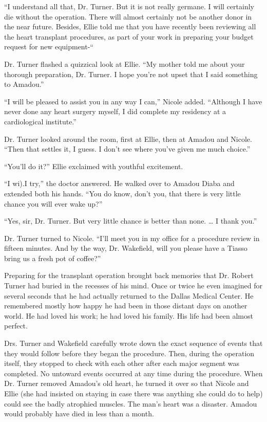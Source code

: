 \documentclass[]{article}
\begin{document}
{“I understand all that, Dr.  Turner.  But it is not really germane.  I will certainly die without the operation.  There will almost certainly not be another donor in the near future.  Besides, Ellie told me that you have recently been reviewing all the heart transplant procedures, as part of your work in preparing your budget request for new equipment-“

Dr.  Turner flashed a quizzical look at Ellie.  “My mother told me about your thorough preparation, Dr.  Turner.  I hope you’re not upset that I said something to Amadou.”

“I will be pleased to assist you in any way I can,” Nicole added.  “Although I have never done any heart surgery myself, I did complete my residency at a cardiological institute.”

Dr.  Turner looked around the room, first at Ellie, then at Amadou and Nicole.  “Then that settles it, I guess.  I don’t see where you’ve given me much choice.”

“You’ll do it?” Ellie exclaimed with youthful excitement.

“I wi).I try,” the doctor answered.  He walked over to Amadou Diaba and extended both his hands.  “You do know, don’t you, that there is very little chance you will ever wake up?”

“Yes, sir, Dr.  Turner.  But very little chance is better than none.  … I thank you.”

Dr.  Turner turned to Nicole.  “I’ll meet you in my office for a procedure review in fifteen minutes.  And by the way, Dr.  Wakefield, will you please have a Tiasso bring us a fresh pot of coffee?”

Preparing for the transplant operation brought back memories that Dr.  Robert Turner had buried in the recesses of his mind.  Once or twice he even imagined for several seconds that he had actually returned to the Dallas Medical Center.  He remembered mostly how happy he had been in those distant days on another world.  He had loved his work; he had loved his family.  His life had been almost perfect.

Drs.  Turner and Wakefield carefully wrote down the exact sequence of events that they would follow before they began the procedure.  Then, during the operation itself, they stopped to check with each other after each major segment was completed.  No untoward events occurred at any time during the procedure.  When Dr.  Turner removed Amadou’s old heart, he turned it over so that Nicole and Ellie (she had insisted on staying in case there was anything she could do to help) could see the badly atrophied muscles.  The man’s heart was a disaster.  Amadou would probably have died in less than a month.

}
\end{document}
